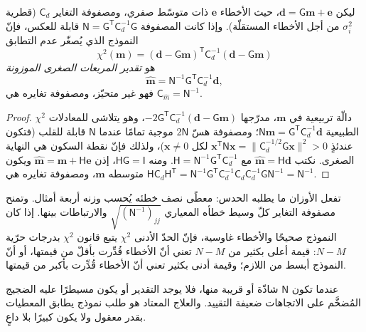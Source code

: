 \begin{theorem}\label{thm:b3:seismology-imaging:wls}
ليكن $\mathbf d = \mathsf G\mathbf m + \mathbf e$، حيث الأخطاء $\mathbf e$
ذات متوسّط صفري، ومصفوفة التغاير $\mathsf C_d$ (قطرية
$\sigma_i^2$ من أجل الأخطاء المستقلّة). وإذا كانت المصفوفة
$\mathsf N = \mathsf G^{\mathsf T}\mathsf C_d^{-1}\mathsf G$ قابلة للعكس، فإنّ
النموذج الذي يُصغّر عدم التطابق
\[
  \chi^2(\mathbf m) = (\mathbf d - \mathsf G\mathbf m)^{\mathsf T}\mathsf C_d^{-1}
  (\mathbf d - \mathsf G\mathbf m)
\]
هو \emph{تقدير المربعات الصغرى الموزونة}
\[
  \hat{\mathbf m} = \mathsf N^{-1}\mathsf G^{\mathsf T}\mathsf C_d^{-1}\mathbf d ,
\]
فهو غير متحيّز، ومصفوفة تغايره هي
$\mathsf C_{\hat m} = \mathsf N^{-1}$.
\end{theorem}

\begin{proof}
$\chi^2$ دالّة تربيعية في $\mathbf m$، مدرّجها
$-2\mathsf G^{\mathsf T}\mathsf C_d^{-1}(\mathbf d - \mathsf G\mathbf m)$، وهو يتلاشى
للمعادلات الطبيعية $\mathsf N\mathbf m = \mathsf G^{\mathsf T}
\mathsf C_d^{-1}\mathbf d$؛ ومصفوفة هسّ $2\mathsf N$ موجبة تمامًا عندما
$\mathsf N$ قابلة للقلب (فتكون عندئذٍ $\mathbf x^{\mathsf T}\mathsf N\mathbf x =
\|\mathsf C_d^{-1/2}\mathsf G\mathbf x\|^2 > 0$ لكل $\mathbf x \ne 0$)، ولذلك فإنّ
نقطة السكون هي النهاية الصغرى. نكتب $\hat{\mathbf m} = \mathsf H\mathbf d$ مع
$\mathsf H = \mathsf N^{-1}\mathsf G^{\mathsf T}\mathsf C_d^{-1}$. ومنه
$\mathsf H\mathsf G = \mathsf I$، إذن $\hat{\mathbf m} = \mathbf m + \mathsf H\mathbf e$
ويكون متوسطه $\mathbf m$، ومصفوفة تغايره هي
$\mathsf H\mathsf C_d\mathsf H^{\mathsf T} =
\mathsf N^{-1}\mathsf G^{\mathsf T}\mathsf C_d^{-1}\mathsf C_d\mathsf C_d^{-1}
\mathsf G\mathsf N^{-1} = \mathsf N^{-1}$.
\end{proof}

تفعل الأوزان ما يطلبه الحدس: معطًى نصف خطئه يُحسب وزنه
أربعة أمثال. وتمنح مصفوفة التغاير كلّ وسيط خطأه المعياري
$\sqrt{(\mathsf N^{-1})_{jj}}$ والارتباطات بينها.
إذا كان النموذج صحيحًا والأخطاء غاوسية، فإنّ الحدّ الأدنى $\chi^2$ يتبع قانون $\chi^2$
بدرجات حرّية $N - M$: قيمة أعلى بكثير من $N - M$ تعني
أنّ الأخطاء قُدِّرت بأقلّ من قيمتها، أو أنّ النموذج أبسط من اللازم؛ وقيمة أدنى بكثير تعني
أنّ الأخطاء قُدِّرت بأكبر من قيمتها.

عندما تكون $\mathsf N$ شاذّة أو قريبة منها، فلا يوجد التقدير أو يكون
مسيطرًا عليه الضجيج المُضخَّم على الاتجاهات ضعيفة التقييد. والعلاج المعتاد
هو طلب نموذج يطابق المعطيات بقدر معقول ولا يكون
كبيرًا بلا داعٍ.

